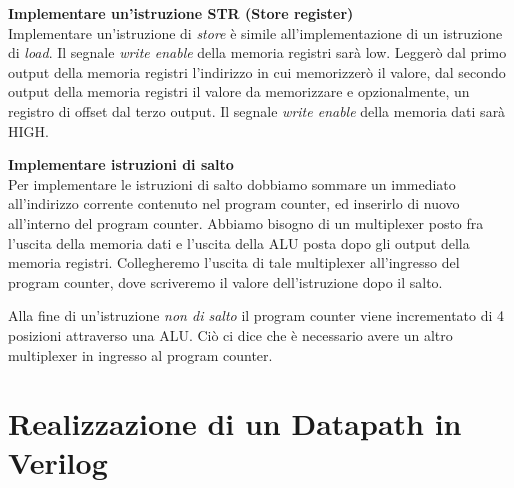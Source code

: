 \begin{defn}
\textbf{Implementare un'istruzione STR (Store register)} \\
Implementare un'istruzione di \textit{store} è simile all'implementazione di un istruzione di \textit{load}.
Il segnale \textit{write enable} della memoria registri sarà low. Leggerò dal primo output della memoria registri l'indirizzo in cui memorizzerò il valore,
dal secondo output della memoria registri il valore da memorizzare e opzionalmente, un registro di offset dal terzo output.
Il segnale \textit{write enable} della memoria dati sarà HIGH.
\end{defn}

\begin{defn}
\textbf{Implementare istruzioni di salto} \\
Per implementare le istruzioni di salto dobbiamo sommare un immediato
all'indirizzo corrente contenuto nel program counter, ed inserirlo di nuovo all'interno del program counter.
Abbiamo bisogno di un multiplexer posto fra l'uscita della memoria dati e l'uscita della ALU posta dopo gli output della memoria registri.
Collegheremo l'uscita di tale multiplexer all'ingresso del program counter, dove scriveremo il valore dell'istruzione dopo il salto.

Alla fine di un'istruzione \textit{non di salto} il program counter viene incrementato di 4 posizioni attraverso una ALU.
Ciò ci dice che è necessario avere un altro multiplexer in ingresso al program counter.
\end{defn}

\section{Realizzazione di un Datapath in Verilog}








